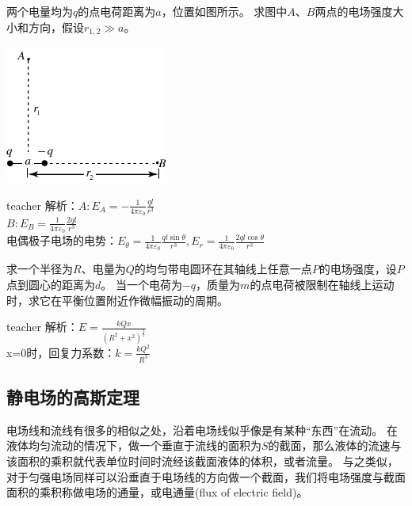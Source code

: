 \begin{example}
两个电量均为$q$的点电荷距离为$a$，位置如图所示。
求图中$A$、$B$两点的电场强度大小和方向，假设$r_{1,2}\gg a$。
\begin{flushright}
\includegraphics[width=0.4\textwidth]{images/elec-problem-3.pdf}
\end{flushright}
\begin{taggedblock}{teacher}
\noindent
解析：$A: E_A=-\frac{1}{4\pi\varepsilon_0}\frac{ql}{r^3}$
\\$B:E_B=\frac{1}{4\pi\varepsilon_0}\frac{2ql}{r^3}$
\\电偶极子电场的电势：$E_\theta=\frac{1}{4\pi\varepsilon_0}\frac{ql\sin\theta}{r^3},E_r=\frac{1}{4\pi\varepsilon_0}\frac{2ql\cos\theta}{r^3}$
\end{taggedblock}
\end{example}


\begin{example}
求一个半径为$R$、电量为$Q$的均匀带电圆环在其轴线上任意一点$P$的电场强度，设$P$点到圆心的距离为$d$。
当一个电荷为$-q$，质量为$m$的点电荷被限制在轴线上运动时，求它在平衡位置附近作微幅振动的周期。
\begin{taggedblock}{teacher}
\newline
解析：$E=\frac{kQx}{(R^2+x^2)^{\frac{3}{2}}}$
\\x=0时，回复力系数：$k=\frac{kQ^2}{R^3}$
\end{taggedblock}
\end{example}
\subsection{静电场的高斯定理}
电场线和流线有很多的相似之处，沿着电场线似乎像是有某种“东西”在流动。
在液体均匀流动的情况下，做一个垂直于流线的面积为$S$的截面，那么液体的流速与该面积的乘积就代表单位时间时流经该截面液体的体积，或者流量。
与之类似，对于匀强电场同样可以沿垂直于电场线的方向做一个截面，我们将电场强度与截面面积的乘积称做电场的通量，或{\heiti 电通量}(flux of electric field)。


